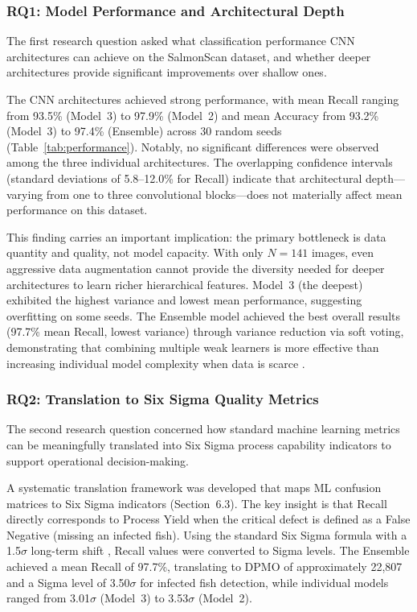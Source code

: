 \documentclass[12pt,a4paper]{article}
\begin{document}
\subsubsection{RQ1: Model Performance and Architectural Depth}
The first research question asked what classification performance CNN architectures can achieve on the SalmonScan dataset, and whether deeper architectures provide significant improvements over shallow ones.

The CNN architectures achieved strong performance, with mean Recall ranging from 93.5\% (Model~3) to 97.9\% (Model~2) and mean Accuracy from 93.2\% (Model~3) to 97.4\% (Ensemble) across 30 random seeds (Table~\ref{tab:performance}). Notably, no significant differences were observed among the three individual architectures. The overlapping confidence intervals (standard deviations of 5.8--12.0\% for Recall) indicate that architectural depth---varying from one to three convolutional blocks---does not materially affect mean performance on this dataset.

This finding carries an important implication: the primary bottleneck is data quantity and quality, not model capacity. With only $N=141$ images, even aggressive data augmentation cannot provide the diversity needed for deeper architectures to learn richer hierarchical features. Model~3 (the deepest) exhibited the highest variance and lowest mean performance, suggesting overfitting on some seeds. The Ensemble model achieved the best overall results (97.7\% mean Recall, lowest variance) through variance reduction via soft voting, demonstrating that combining multiple weak learners is more effective than increasing individual model complexity when data is scarce \citep{BejaniGhatee2021}.

\subsubsection{RQ2: Translation to Six Sigma Quality Metrics}
The second research question concerned how standard machine learning metrics can be meaningfully translated into Six Sigma process capability indicators to support operational decision-making.

A systematic translation framework was developed that maps ML confusion matrices to Six Sigma indicators (Section~6.3). The key insight is that Recall directly corresponds to Process Yield when the critical defect is defined as a False Negative (missing an infected fish). Using the standard Six Sigma formula with a 1.5$\sigma$ long-term shift \citep{Tsung2023, montgomery2020introduction}, Recall values were converted to Sigma levels. The Ensemble achieved a mean Recall of 97.7\%, translating to DPMO of approximately 22,807 and a Sigma level of 3.50$\sigma$ for infected fish detection, while individual models ranged from 3.01$\sigma$ (Model~3) to 3.53$\sigma$ (Model~2).
\end{document}

